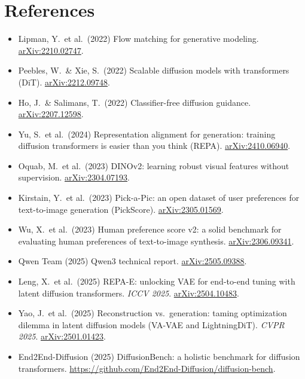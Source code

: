 \documentclass{article}
\begin{document}
\section*{References}
\vspace{-0.5em}
{\footnotesize
\begin{itemize}[leftmargin=1.9em, label={}, itemsep=0pt, topsep=1pt]
  \item[{[1]}] Lipman, Y.\ et al.\ (2022) Flow matching for generative modeling. \href{https://arxiv.org/abs/2210.02747}{arXiv:2210.02747}.
  \item[{[2]}] Peebles, W.\ \& Xie, S.\ (2022) Scalable diffusion models with transformers (DiT). \href{https://arxiv.org/abs/2212.09748}{arXiv:2212.09748}.
  \item[{[3]}] Ho, J.\ \& Salimans, T.\ (2022) Classifier-free diffusion guidance. \href{https://arxiv.org/abs/2207.12598}{arXiv:2207.12598}.
  \item[{[4]}] Yu, S.\ et al.\ (2024) Representation alignment for generation: training diffusion transformers is easier than you think (REPA). \href{https://arxiv.org/abs/2410.06940}{arXiv:2410.06940}.
  \item[{[5]}] Oquab, M.\ et al.\ (2023) DINOv2: learning robust visual features without supervision. \href{https://arxiv.org/abs/2304.07193}{arXiv:2304.07193}.
  \item[{[6]}] Kirstain, Y.\ et al.\ (2023) Pick-a-Pic: an open dataset of user preferences for text-to-image generation (PickScore). \href{https://arxiv.org/abs/2305.01569}{arXiv:2305.01569}.
  \item[{[7]}] Wu, X.\ et al.\ (2023) Human preference score v2: a solid benchmark for evaluating human preferences of text-to-image synthesis. \href{https://arxiv.org/abs/2306.09341}{arXiv:2306.09341}.
  \item[{[8]}] Qwen Team (2025) Qwen3 technical report. \href{https://arxiv.org/abs/2505.09388}{arXiv:2505.09388}.
  \item[{[9]}] Leng, X.\ et al.\ (2025) REPA-E: unlocking VAE for end-to-end tuning with latent diffusion transformers. \emph{ICCV 2025}. \href{https://arxiv.org/abs/2504.10483}{arXiv:2504.10483}.
  \item[{[10]}] Yao, J.\ et al.\ (2025) Reconstruction vs.\ generation: taming optimization dilemma in latent diffusion models (VA-VAE and LightningDiT). \emph{CVPR 2025}. \href{https://arxiv.org/abs/2501.01423}{arXiv:2501.01423}.
  \item[{[11]}] End2End-Diffusion (2025) DiffusionBench: a holistic benchmark for diffusion transformers. \url{https://github.com/End2End-Diffusion/diffusion-bench}.
\end{itemize}
}
\end{document}
